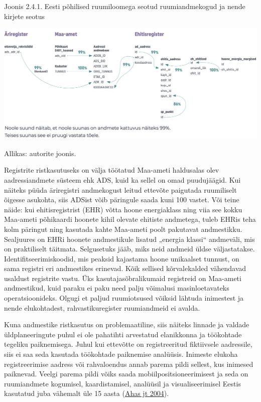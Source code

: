 \documentclass[estonian,]{article}
\begin{document}
{Joonis 2.4.1.} Eesti põhilised ruumiloomega seotud ruumiandmekogud ja nende kirjete seotus

\begin{center}\includegraphics[width=0.9\linewidth]{figures/2-chapter/fig241} \end{center}
\begin{imgsource}
{Allikas:} autorite joonis.
\end{imgsource}

Registrite ristkasutuseks on välja töötatud Maa-ameti haldusalas olev aadressiandmete süsteem ehk ADS, kuid ka sellel on omad puudujäägid. Kui näiteks püüda äriregistri andmekogust leitud ettevõte paigutada ruumiliselt õigesse asukohta, siis ADSist võib päringule saada kuni 100 vastet. Või teine näide: kui ehitisregistrist (EHR) võtta hoone energiaklass ning viia see kokku Maa-ameti põhikaardi hoonete kihil olevate ehitiste andmetega, tuleb EHRis teha kolm päringut ning kasutada kahte Maa-ameti poolt pakutavat andmestikku. Sealjuures on EHRi hoonete andmestikule lisatud „energia klassi`` andmeväli, mis on praktiliselt täitmata. Selgusetuks jääb, miks neid andmeid üldse väljastatakse. Identifitseerimiskoodid, mis peaksid kajastama hoone unikaalset tunnust, on sama registri eri andmestikes erinevad. Kõik sellised kõrvalekalded vähendavad usaldust registrite vastu. Üks kasutajasõbralikumaid registreid on Maa-ameti andmestikud, kuid paraku ei paku need palju võimalusi masinloetavateks operatsioonideks. Olgugi et paljud ruumiotsused võiksid lähtuda inimestest ja nende elukohtadest, rahvastikuregister ruumiandmeid ei avalda.

Kuna andmestike ristkasutus on problemaatiline, siis näiteks linnade ja valdade üldplaneeringute puhul ei ole pahatihti arvestatud elanikkonna ja töökohtade tegeliku paiknemisega. Juhul kui ettevõtte on registreeritud fiktiivsele aadressile, siis ei saa seda kasutada töökohtade paiknemise analüüsis. Inimeste elukoha registreerimise aadress või rahvaloendus annab parema pildi sellest, kus inimesed paiknevad. Veelgi parema pildi võiks saada mobiilpositsioneerimisest ja seda on ruumiandmete kogumisel, kaardistamisel, analüüsil ja visualiseerimisel Eestis kasutatud juba vähemalt üle 15 aasta (\protect\hyperlink{Ahas2004}{Ahas jt 2004}).
\end{document}
